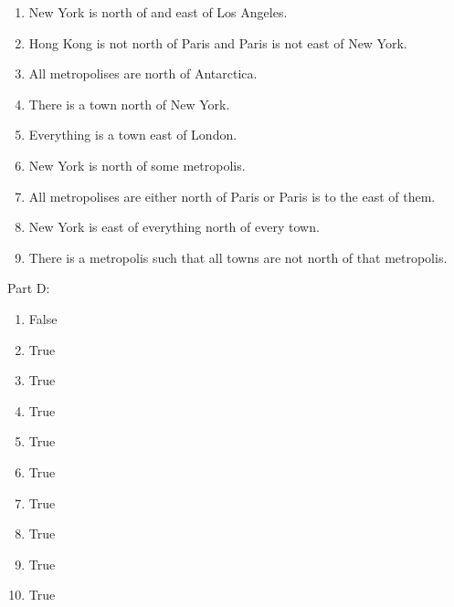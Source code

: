 \documentclass[
]{book}
\providecommand{\tightlist}{%
  \setlength{\itemsep}{0pt}\setlength{\parskip}{0pt}}
\begin{document}
\begin{enumerate}
\def\labelenumi{\arabic{enumi}.}
\tightlist
\item
  New York is north of and east of Los Angeles.
\item
  Hong Kong is not north of Paris and Paris is not east of New York.
\item
  All metropolises are north of Antarctica.
\item
  There is a town north of New York.
\item
  Everything is a town east of London.
\item
  New York is north of some metropolis.
\item
  All metropolises are either north of Paris or Paris is to the east of them.
\item
  New York is east of everything north of every town.
\item
  There is a metropolis such that all towns are not north of that metropolis.
\end{enumerate}

Part D:

\begin{enumerate}
\def\labelenumi{\arabic{enumi}.}
\tightlist
\item
  False
\item
  True
\item
  True
\item
  True
\item
  True
\item
  True
\item
  True
\item
  True
\item
  True
\item
  True
\end{enumerate}

  
\end{document}
